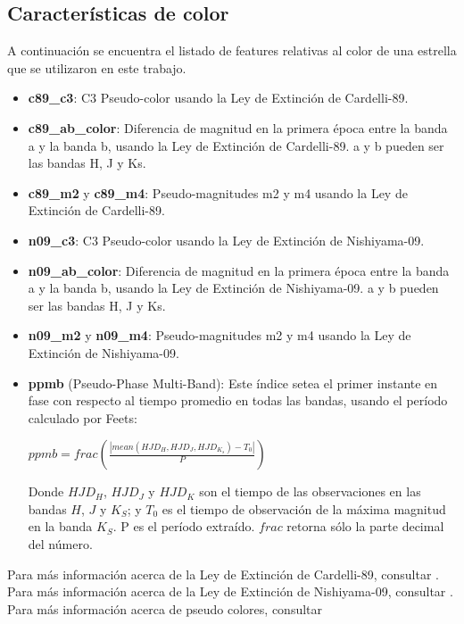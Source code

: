 \begin{appendix}
\section{Características de color}

A continuación se encuentra el listado de features relativas al color de una estrella que se utilizaron en este trabajo.

\begin{itemize}
\item \textbf{c89\_c3}: C3 Pseudo-color usando la Ley de Extinción de Cardelli-89.
\item \textbf{c89\_ab\_color}: Diferencia de magnitud en la primera época entre la banda a y la banda b, usando la Ley de Extinción de Cardelli-89. a y b pueden ser las bandas H, J y Ks.
\item \textbf{c89\_m2} y \textbf{c89\_m4}: Pseudo-magnitudes m2 y m4  usando la Ley de Extinción de Cardelli-89.
\item \textbf{n09\_c3}: C3 Pseudo-color usando la Ley de Extinción de Nishiyama-09.
\item \textbf{n09\_ab\_color}: Diferencia de magnitud en la primera época entre la banda a y la banda b, usando la Ley de Extinción de Nishiyama-09. a y b pueden ser las bandas H, J y Ks.
\item \textbf{n09\_m2} y \textbf{n09\_m4}: Pseudo-magnitudes m2 y m4 usando la Ley de Extinción de Nishiyama-09.
\item \textbf{ppmb} (Pseudo-Phase Multi-Band): Este índice setea el primer instante en fase con respecto al tiempo promedio en todas las bandas, usando el período calculado por Feets: \\

\begin{center}
$ ppmb = frac (\frac{|mean(HJD_H, HJD_J, HJD_{K_s}) - T_0|}{P}) $

\end{center}

Donde $HJD_H$, $HJD_J$ y $HJD_K$ son el tiempo de las observaciones en las bandas $H$, $J$  y $K_S$; y $T_0$ es el tiempo de observación de la máxima magnitud en la banda $K_S$. P es el período extraído. $frac$ retorna sólo la parte decimal del número.
\end{itemize}


Para más información acerca de la Ley de Extinción de Cardelli-89, consultar \cite{cardelli}. Para más información acerca de la Ley de Extinción de Nishiyama-09, consultar \cite{Nishiyama}. Para más información acerca de pseudo colores, consultar \cite{vvv}


\end{appendix}
